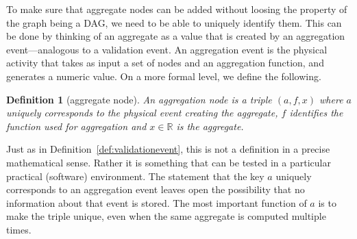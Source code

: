 \documentclass[a4paper, 11pt,titlepage]{article}
\newtheorem{definition}{Definition}
\begin{document}
To make sure that aggregate nodes can be added without loosing the property of
the graph being a DAG, we need to be able to uniquely identify them. This can
be done by thinking of an aggregate as a value that is created by an
aggregation event---analogous to a validation event. An aggregation event is
the physical activity that takes as input a set of nodes and an aggregation
function, and generates a numeric value. On a more formal level, we define the
following.
%
\begin{definition}[aggregate node]
An \emph{aggregation node} is a triple $(a,f,x)$ where $a$ uniquely corresponds
to the physical event creating the aggregate, $f$ identifies the function used for
aggregation and $x\in \mathbb{R}$ is the aggregate.
\end{definition}
Just as in Definition~\ref{def:validationevent}, this is not a definition in a
precise mathematical sense. Rather it is something that can be tested in a
particular practical (software) environment. The statement that the key $a$
uniquely corresponds to an aggregation event leaves open the possibility that
no information about that event is stored. The most important function of $a$
is to make the triple unique, even when the same aggregate is computed multiple
times.
\end{document}
